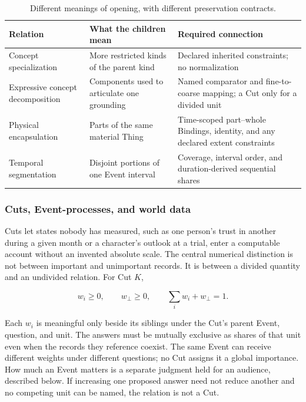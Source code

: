 \documentclass[11pt,a4paper]{article}
\begin{document}
\begin{table}[htbp]
\centering
\small
\begin{tabularx}{\textwidth}{@{}p{}YY@{}}
\toprule
Relation & What the children mean & Required connection \\
\midrule
Concept specialization & More restricted kinds of the parent kind & Declared inherited constraints; no normalization \\
Expressive concept decomposition & Components used to articulate one grounding & Named comparator and fine-to-coarse mapping; a Cut only for a divided unit \\
Physical encapsulation & Parts of the same material Thing & Time-scoped part--whole Bindings, identity, and any declared extent constraints \\
Temporal segmentation & Disjoint portions of one Event interval & Coverage, interval order, and duration-derived sequential shares \\
\bottomrule
\end{tabularx}
\caption{Different meanings of opening, with different preservation contracts.}
\label{tab:refinement-relations}
\end{table}

\subsubsection{Cuts, Event-processes, and world data}
\label{sec:normalized-cuts}

Cuts let states nobody has measured, such as one person's trust in another
during a given month or a character's outlook at a trial, enter a computable
account without an invented absolute scale. The central numerical distinction is not between important and unimportant
records. It is between a divided quantity and an undivided relation. For Cut
$K$,

\begin{equation}
  w_i\ge 0,\qquad w_{\bot}\ge 0,\qquad
  \sum_i w_i+w_{\bot}=1.
  \label{eq:local-simplex-theory}
\end{equation}

Each $w_i$ is meaningful only beside its siblings under the Cut's parent Event,
question, and unit. The answers must be mutually exclusive as shares of that
unit even when the records they reference coexist. The same Event can receive
different weights under different questions; no Cut assigns it a global
importance. How much an Event matters is a separate judgment held for an
audience, described below. If increasing one proposed answer need not reduce another and no
competing unit can be named, the relation is not a Cut.
\end{document}
